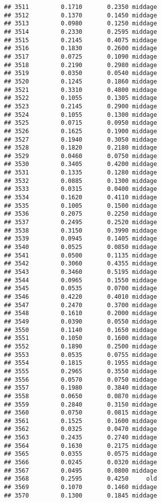 \documentclass[
]{article}
\begin{document}
\begin{verbatim}
## 3511         0.1710       0.2350 middage
## 3512         0.1370       0.1450 middage
## 3513         0.0980       0.1250 middage
## 3514         0.2330       0.2595 middage
## 3515         0.2145       0.4075 middage
## 3516         0.1830       0.2600 middage
## 3517         0.0725       0.1090 middage
## 3518         0.2190       0.2980 middage
## 3519         0.0350       0.0540 middage
## 3520         0.1245       0.1860 middage
## 3521         0.3310       0.4800 middage
## 3522         0.1055       0.1305 middage
## 3523         0.2145       0.2900 middage
## 3524         0.1055       0.1300 middage
## 3525         0.0715       0.0950 middage
## 3526         0.1625       0.1900 middage
## 3527         0.1940       0.3050 middage
## 3528         0.1820       0.2180 middage
## 3529         0.0460       0.0750 middage
## 3530         0.3405       0.4200 middage
## 3531         0.1335       0.1280 middage
## 3532         0.0885       0.1300 middage
## 3533         0.0315       0.0400 middage
## 3534         0.1620       0.4110 middage
## 3535         0.1005       0.1500 middage
## 3536         0.2075       0.2250 middage
## 3537         0.2495       0.2520 middage
## 3538         0.3150       0.3990 middage
## 3539         0.0945       0.1405 middage
## 3540         0.0525       0.0850 middage
## 3541         0.0500       0.1135 middage
## 3542         0.3060       0.4355 middage
## 3543         0.3460       0.5195 middage
## 3544         0.0965       0.1550 middage
## 3545         0.0535       0.0700 middage
## 3546         0.4220       0.4010 middage
## 3547         0.2470       0.3700 middage
## 3548         0.1610       0.2000 middage
## 3549         0.0390       0.0550 middage
## 3550         0.1140       0.1650 middage
## 3551         0.1050       0.1600 middage
## 3552         0.1890       0.2500 middage
## 3553         0.0535       0.0755 middage
## 3554         0.1815       0.1955 middage
## 3555         0.2965       0.3550 middage
## 3556         0.0570       0.0750 middage
## 3557         0.1980       0.3840 middage
## 3558         0.0650       0.0870 middage
## 3559         0.2840       0.3150 middage
## 3560         0.0750       0.0815 middage
## 3561         0.1525       0.1600 middage
## 3562         0.0325       0.0470 middage
## 3563         0.2435       0.2740 middage
## 3564         0.1630       0.2175 middage
## 3565         0.0355       0.0575 middage
## 3566         0.0245       0.0320 middage
## 3567         0.0495       0.0800 middage
## 3568         0.2595       0.4250     old
## 3569         0.1070       0.1460 middage
## 3570         0.1300       0.1845 middage

\end{verbatim}
\end{document}

